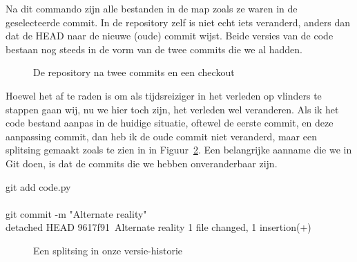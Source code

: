 Na dit commando zijn alle bestanden in de map zoals ze waren in de geselecteerde commit. In de repository zelf is niet echt iets veranderd, anders dan dat de HEAD naar de nieuwe (oude) commit wijst. Beide versies van de code bestaan nog steeds in de vorm van de twee commits die we al hadden.

\begin{figure}[ht]
\label{fig:checkout}
\caption{De repository na twee commits en een checkout}
\end{figure}

Hoewel het af te raden is om als tijdsreiziger in het verleden op vlinders te stappen\cite{bradburry} gaan wij, nu we hier toch zijn, het verleden wel veranderen. Als ik het code bestand aanpas in de huidige situatie, oftewel de eerste commit, en deze aanpassing commit, dan heb ik de oude commit niet veranderd, maar een splitsing gemaakt zoals te zien in in Figuur~\ref{fig:split}. Een belangrijke aanname die we in Git doen, is dat de commits die we hebben onveranderbaar zijn.

\begin{bash}
 git add code.py\\
~ \\
 git commit -m "Alternate reality" \\
\lbrack detached HEAD 9617f91\rbrack\ Alternate reality
 1 file changed, 1 insertion(+)
\end{bash}

\begin{figure}[ht]
\label{fig:split}
\caption{Een splitsing in onze versie-historie}
\end{figure}

